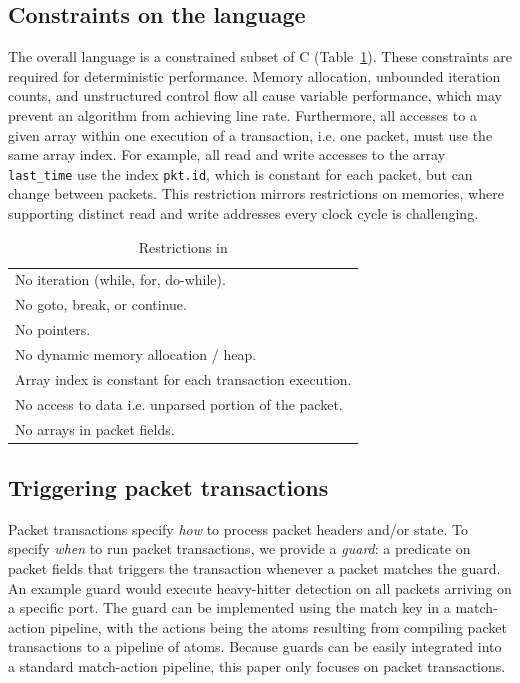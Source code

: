 \subsection{Constraints on the language}
\label{ss:constraints}

The overall language is a constrained subset of C
(Table~\ref{tab:restrict}).  These constraints are required for
deterministic performance.  Memory allocation, unbounded iteration
counts, and unstructured control flow all cause variable performance,
which may prevent an algorithm from achieving line rate.
Furthermore, all accesses to a given array within one execution of a
transaction, i.e. one packet, must use the same array index. For
example, all read and write accesses to the array \texttt{last\_time}
use the index \texttt{pkt.id}, which is constant for each packet, but
can change between packets. This restriction mirrors restrictions on
memories, where supporting distinct read and write addresses every
clock cycle is challenging.

\begin{table}
  \begin{tabular}{p{}}
    No iteration (while, for, do-while).\\
    No goto, break, or continue.\\
    No pointers.\\
    No dynamic memory allocation / heap.\\
    Array index is constant for each transaction execution.\\
    No access to data i.e. unparsed portion of the packet.\\
    No arrays in packet fields.\\
  \end{tabular}
  \caption{Restrictions in \pktlanguage}
  \label{tab:restrict}
\end{table}

\subsection{Triggering packet transactions}
\label{ss:guards}
Packet transactions specify \textit{how} to process packet headers and/or
state.  To specify {\em when} to run packet transactions, we provide a {\em
guard}: a predicate on packet fields that triggers the transaction whenever a
packet matches the guard. An example guard would execute heavy-hitter detection
on all packets arriving on a specific port. The guard can be implemented using
the match key in a match-action pipeline, with the actions being the atoms
resulting from compiling packet transactions to a pipeline of atoms. Because
guards can be easily integrated into a standard match-action pipeline, this
paper only focuses on packet transactions.

